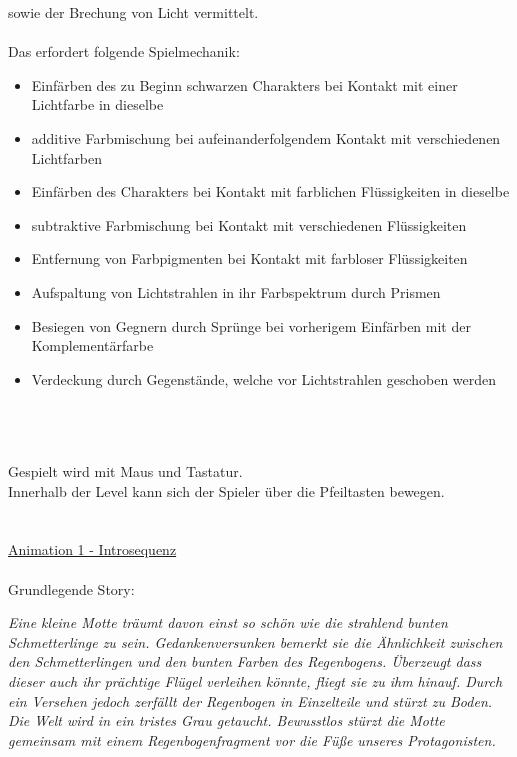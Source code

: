 \documentclass[10pt,a4paper,notitlepage]{report}
\begin{document}
	sowie der Brechung von Licht vermittelt.\\
	\\
	Das erfordert folgende Spielmechanik:\\
	\begin{itemize}
	\item Einfärben des zu Beginn schwarzen Charakters bei Kontakt mit einer Lichtfarbe in dieselbe
	\item additive Farbmischung bei aufeinanderfolgendem Kontakt mit verschiedenen Lichtfarben
	\item Einfärben des Charakters bei Kontakt mit farblichen Flüssigkeiten in dieselbe
	\item subtraktive Farbmischung bei Kontakt mit verschiedenen Flüssigkeiten
	\item Entfernung von Farbpigmenten bei Kontakt mit farbloser Flüssigkeiten
	\item Aufspaltung von Lichtstrahlen in ihr Farbspektrum durch Prismen
	\item Besiegen von Gegnern durch Sprünge bei vorherigem Einfärben mit der Komplementärfarbe
	\item Verdeckung durch Gegenstände, welche vor Lichtstrahlen geschoben werden
	\end{itemize}\
	\\
	\\
	\\
	\Text
		Gespielt wird mit Maus und Tastatur.\\
	Innerhalb der Level kann sich der Spieler über die Pfeiltasten bewegen.
	\clearpage\
	\marginpar{\vspace{3.0mm} \color{orange}\rule{0.8mm}{53.3mm} \\[3mm] \color{hellorange}\rule{0.8mm}{170mm}}
	\\
	\Zwei{2. Ablauf}\
	\\
	\\
	\Text
	\underline{Animation 1 - Introsequenz}\
	\\
	\\
		Grundlegende Story:\\
	\begin{flushright}
	\textit{Eine kleine Motte träumt davon einst so schön wie die strahlend bunten Schmetterlinge zu sein. Gedankenversunken bemerkt sie 
	die Ähnlichkeit zwischen den Schmetterlingen und den bunten Farben des Regenbogens. Überzeugt dass dieser auch ihr prächtige Flügel verleihen könnte, 
	fliegt sie zu ihm hinauf. Durch ein Versehen jedoch zerfällt der Regenbogen in Einzelteile und stürzt zu Boden. \\
	Die Welt wird in ein tristes Grau getaucht. Bewusstlos stürzt die Motte gemeinsam mit einem Regenbogenfragment vor die Füße unseres Protagonisten.}
	\end{flushright}\
\end{document}
